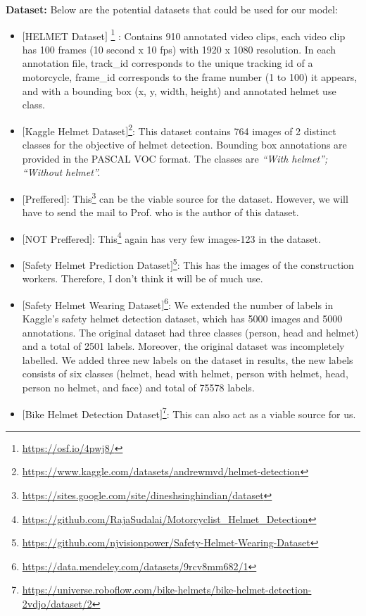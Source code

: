 
\textbf{Dataset:} Below are the potential datasets that could be used for our model:
\begin{itemize}
    \item $[$HELMET Dataset$]$ 
     \footnote{\url{https://osf.io/4pwj8/}} : Contains 910 annotated video clips, each video clip has 100 frames (10 second x 10 fps) with 1920 x 1080 resolution. In each annotation file, track\_id corresponds to the unique tracking id of a motorcycle, frame\_id corresponds to the frame number (1 to 100) it appears, and with a bounding box (x, y, width, height) and annotated helmet use class. 
    
    \item $[$Kaggle Helmet Dataset$]$\footnote{\url{https://www.kaggle.com/datasets/andrewmvd/helmet-detection}}:  This dataset contains 764 images of 2 distinct classes for the objective of helmet detection. Bounding box annotations are provided in the PASCAL VOC format. The classes are \textit{``With helmet''; ``Without helmet''.} 

    \item $[$Preffered$]$: This\footnote{\url{https://sites.google.com/site/dineshsinghindian/dataset}} can be the viable source for the dataset. However, we will have to send the mail to Prof. who is the  author of this dataset. 

    \item $[$NOT Preffered$]$:   This\footnote{\url{https://github.com/RajaSudalai/Motorcyclist_Helmet_Detection}} again has very few images-123 in the dataset.  

    \item $[$Safety Helmet Prediction Dataset$]$\footnote{\url{https://github.com/njvisionpower/Safety-Helmet-Wearing-Dataset}}: This has the images of the construction workers. Therefore, I don't think it will be of much use. 

    \item $[$Safety Helmet Wearing Dataset$]$\footnote{\url{https://data.mendeley.com/datasets/9rcv8mm682/1}}: We extended the number of labels in Kaggle’s safety helmet detection dataset, which has 5000 images and 5000 annotations. The original dataset had three classes (person, head and helmet) and a total of 2501 labels. Moreover, the original dataset was incompletely labelled. We added three new labels on the dataset in results, the new labels consists of six classes (helmet, head with helmet, person with helmet, head, person no helmet, and face) and total of 75578 labels.  

    \item $[$Bike Helmet Detection Dataset$]$\footnote{\url{https://universe.roboflow.com/bike-helmets/bike-helmet-detection-2vdjo/dataset/2}}: This can also act as a viable source for us. 
    
\end{itemize}


